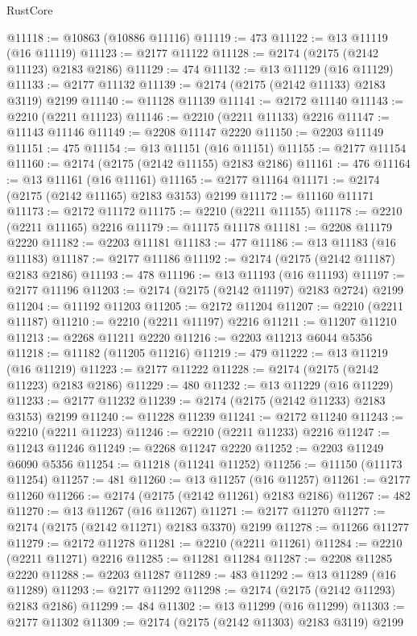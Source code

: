 \begin{lexlean}{RustCore}
\begin{coremodule}
@11118 := @10863 (@10886 @11116)
@11119 := 473
@11122 := @13 @11119 (@16 @11119)
@11123 := @2177 @11122
@11128 := @2174 (@2175 (@2142 @11123) @2183 @2186)
@11129 := 474
@11132 := @13 @11129 (@16 @11129)
@11133 := @2177 @11132
@11139 := @2174 (@2175 (@2142 @11133) @2183 @3119) @2199
@11140 := @11128 @11139
@11141 := @2172 @11140
@11143 := @2210 (@2211 @11123)
@11146 := @2210 (@2211 @11133) @2216
@11147 := @11143 @11146
@11149 := @2208 @11147 @2220
@11150 := @2203 @11149
@11151 := 475
@11154 := @13 @11151 (@16 @11151)
@11155 := @2177 @11154
@11160 := @2174 (@2175 (@2142 @11155) @2183 @2186)
@11161 := 476
@11164 := @13 @11161 (@16 @11161)
@11165 := @2177 @11164
@11171 := @2174 (@2175 (@2142 @11165) @2183 @3153) @2199
@11172 := @11160 @11171
@11173 := @2172 @11172
@11175 := @2210 (@2211 @11155)
@11178 := @2210 (@2211 @11165) @2216
@11179 := @11175 @11178
@11181 := @2208 @11179 @2220
@11182 := @2203 @11181
@11183 := 477
@11186 := @13 @11183 (@16 @11183)
@11187 := @2177 @11186
@11192 := @2174 (@2175 (@2142 @11187) @2183 @2186)
@11193 := 478
@11196 := @13 @11193 (@16 @11193)
@11197 := @2177 @11196
@11203 := @2174 (@2175 (@2142 @11197) @2183 @2724) @2199
@11204 := @11192 @11203
@11205 := @2172 @11204
@11207 := @2210 (@2211 @11187)
@11210 := @2210 (@2211 @11197) @2216
@11211 := @11207 @11210
@11213 := @2268 @11211 @2220
@11216 := @2203 @11213 @6044 @5356
@11218 := @11182 (@11205 @11216)
@11219 := 479
@11222 := @13 @11219 (@16 @11219)
@11223 := @2177 @11222
@11228 := @2174 (@2175 (@2142 @11223) @2183 @2186)
@11229 := 480
@11232 := @13 @11229 (@16 @11229)
@11233 := @2177 @11232
@11239 := @2174 (@2175 (@2142 @11233) @2183 @3153) @2199
@11240 := @11228 @11239
@11241 := @2172 @11240
@11243 := @2210 (@2211 @11223)
@11246 := @2210 (@2211 @11233) @2216
@11247 := @11243 @11246
@11249 := @2268 @11247 @2220
@11252 := @2203 @11249 @6090 @5356
@11254 := @11218 (@11241 @11252)
@11256 := @11150 (@11173 @11254)
@11257 := 481
@11260 := @13 @11257 (@16 @11257)
@11261 := @2177 @11260
@11266 := @2174 (@2175 (@2142 @11261) @2183 @2186)
@11267 := 482
@11270 := @13 @11267 (@16 @11267)
@11271 := @2177 @11270
@11277 := @2174 (@2175 (@2142 @11271) @2183 @3370) @2199
@11278 := @11266 @11277
@11279 := @2172 @11278
@11281 := @2210 (@2211 @11261)
@11284 := @2210 (@2211 @11271) @2216
@11285 := @11281 @11284
@11287 := @2208 @11285 @2220
@11288 := @2203 @11287
@11289 := 483
@11292 := @13 @11289 (@16 @11289)
@11293 := @2177 @11292
@11298 := @2174 (@2175 (@2142 @11293) @2183 @2186)
@11299 := 484
@11302 := @13 @11299 (@16 @11299)
@11303 := @2177 @11302
@11309 := @2174 (@2175 (@2142 @11303) @2183 @3119) @2199

\end{coremodule}
\end{lexlean}
